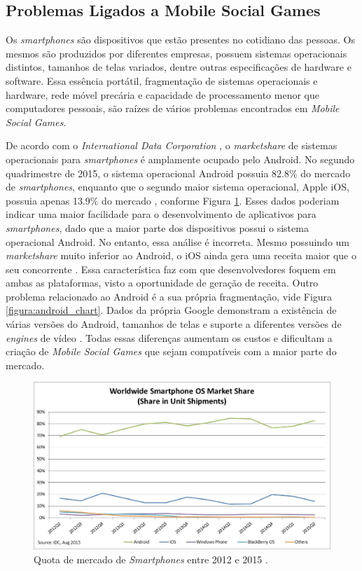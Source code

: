   \subsection{Problemas Ligados a Mobile Social Games}

Os \textit{smartphones} são dispositivos que estão presentes no cotidiano das
pessoas. Os mesmos são produzidos por diferentes empresas, possuem sistemas
operacionais distintos, tamanhos de telas variados, dentre outras
especificações de hardware e software. Essa essência portátil, fragmentação de
sistemas operacionais e hardware, rede móvel precária e capacidade de
processamento menor que computadores pessoais, são raízes de vários problemas
encontrados em \textit{Mobile Social Games}.

De acordo com o \textit{International Data Corporation} \cite{idc}, o
\textit{marketshare} de sistemas operacionais para \textit{smartphones} é
amplamente ocupado pelo Android. No segundo quadrimestre de 2015, o sistema
operacional Android possuia 82.8\% do mercado de \textit{smartphones}, enquanto
que o segundo maior sistema operacional, Apple iOS, possuia apenas 13.9\% do
mercado \cite{idc}, conforme Figura \ref{figura:market_share}. Esses dados
poderiam indicar uma maior facilidade para o desenvolvimento de aplicativos
para \textit{smartphones}, dado que a maior parte dos dispositivos possui o
sistema operacional Android. No entanto, essa análise é incorreta. Mesmo
possuindo um \textit{marketshare} muito inferior ao Android, o iOS ainda gera
uma receita maior que o seu concorrente \cite{appAnnie}. Essa característica
faz com que desenvolvedores foquem em ambas as plataformas, visto a
oportunidade de geração de receita. Outro problema relacionado ao Android é a
sua própria fragmentação, vide Figura \ref{figura:android_chart}. Dados da
própria Google demonstram a existência de várias versões do Android, tamanhos
de telas e suporte a diferentes versões de \textit{engines} de vídeo
\cite{dashboardGoogle}. Todas essas diferenças aumentam os custos e dificultam
a criação de \textit{Mobile Social Games} que sejam compatíveis com a maior
parte do mercado.

\begin{figure}[h]
  \centering
  \includegraphics[width=12cm]{figuras/market_share}
  \caption{Quota de mercado de \textit{Smartphones} entre 2012 e 2015 \cite{idc}.}
  \label{figura:market_share}
\end{figure}

